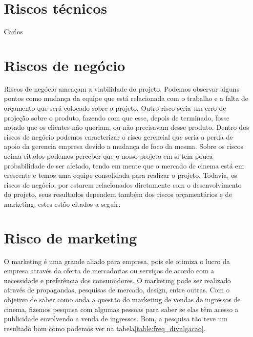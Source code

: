 \documentclass[12pt]{article}
\begin{document}
    \section{Riscos técnicos}
        Carlos
    \section{Riscos de negócio}
        Riscos de negócio ameaçam a viabilidade do projeto. Podemos observar alguns pontos como mudança da equipe que está relacionada com o trabalho e a falta de orçamento que será colocado sobre o projeto. Outro risco seria um erro de projeção sobre o produto, fazendo com que esse, depois de terminado, fosse notado que os clientes não queriam, ou não precisavam desse produto. 
        Dentro dos riscos de negócio podemos caracterizar o risco gerencial que seria a perda de apoio da gerencia empresa devido a mudança de foco da mesma. 
        Sobre os riscos acima citados podemos perceber que o nosso projeto em si tem pouca probabilidade de ser afetado, tendo em mente que o mercado de cinema está em crescente e temos uma equipe consolidada para realizar o projeto.
        Todavia, os riscos de negócio, por estarem relacionados diretamente com o desenvolvimento do projeto, seus resultados dependem também dos riscos orçamentários e de marketing, estes estão citados a seguir.
    \section{Risco de marketing}
        O marketing é uma grande aliado para empresa, pois ele otimiza o lucro da empresa através da oferta de mercadorias ou serviços de acordo com a necessidade e preferência dos consumidores. 
        O marketing pode ser realizado através de propagandas, pesquisas de mercado, design, entre outras. 
        Com o objetivo de saber como anda a questão do marketing de vendas de ingressos de cinema, fizemos pesquisa com algumas pessoas para saber se elas têm acesso a publicidade envolvendo a venda de ingressos. Bom, a pesquisa tão teve um resultado bom como podemos ver na tabela\ref{table:freq_divulgacao}.
        
\end{document}
